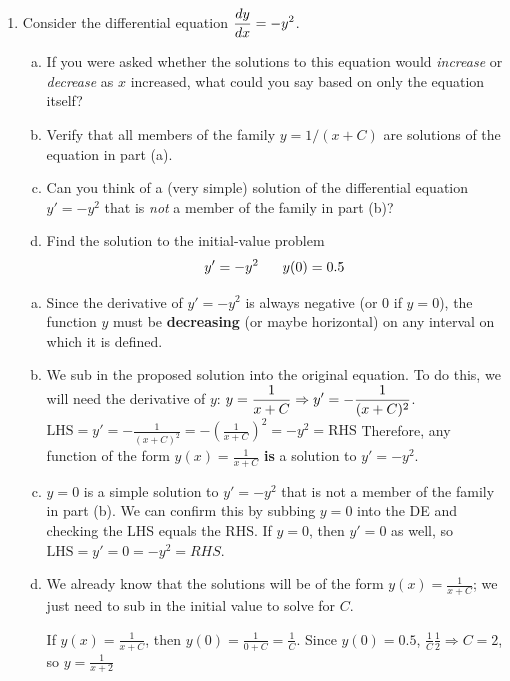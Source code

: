 \begin{enumerate}
\item
\begin{Question}
  Consider the differential equation $\displaystyle \frac{dy}{dx} = -y^2$.
\begin{enumerate}[(a)]
\item If you were asked whether the solutions to this equation would
  {\em increase} or {\em decrease} as $x$ increased, what could you
  say based on only the equation itself?
\item Verify that all members of the family $y = 1/(x + C)$ are
  solutions of the equation in part (a).
\item Can you think of a (very simple) solution of the differential
  equation $y' = -y^2$ that is {\em not} a member of the family in
  part (b)?
\item Find the solution to the initial-value problem
\begin{equation*}
	y' = -y^2 \hspace{6mm} y(0) = 0.5
\end{equation*}
\end{enumerate}
\end{Question}
\begin{Solution}
\begin{enumerate}[(a)]
\item Since the derivative of $y' = -y^2$ is always negative (or 0 if
  $y = 0$), the function $y$ must be {\bf decreasing} (or maybe
  horizontal) on any interval on which it is defined.
\item We sub in the proposed solution into the original equation.  To do this, we will need the derivative of $y$:  $\displaystyle y = \frac{1}{x + C} \Rightarrow y' = -\frac{1}{(x + C)^2}$.\\
  $\text{LHS} = y' = -\frac{1}{(x + C)^2} = -\left(\frac{1}{x + C}
  \right)^2 = -y^2 = \text{RHS}$ Therefore, any function of the form
  $y(x) = \frac{1}{x+C}$ {\bf is} a solution to $y' = -y^2$.
\item $y=0$ is a simple solution to $y'=-y^2$ that is not a member of
  the family in part (b).  We can confirm this by subbing $y=0$ into
  the DE and checking the LHS equals the RHS.  If $y=0$, then $y'= 0$
  as well, so $\text{LHS} = y' = 0 = -y^2 = RHS$.
\item We already know that the solutions will be of the form
  $y(x) = \frac{1}{x+C}$; we just need to sub in the initial value to
  solve for $C$.

  If $y(x) = \frac{1}{x + C}$, then
  $y(0) = \frac{1}{0 + C} = \frac{1}{C}$.  Since $y(0) = 0.5$,
  $\frac{1}{C} \frac{1}{2} \Rightarrow C = 2$, so $y =\frac{1}{x + 2}$
\end{enumerate}
\end{Solution}


\end{enumerate}
